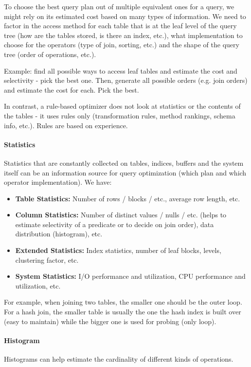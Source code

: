 To choose the best query plan out of multiple equivalent ones for a query, we might rely on its estimated cost based on many types of information. We need to factor in the access method for each table that is at the leaf level of the query tree (how are the tables stored, is there an index, etc.), what implementation to choose for the operators (type of join, sorting, etc.) and the shape of the query tree (order of operations, etc.).

Example: find all possible ways to access leaf tables and estimate the cost and selectivity - pick the best one. Then, generate all possible orders (e.g. join orders) and estimate the cost for each. Pick the best.

In contrast, a rule-based optimizer does not look at statistics or the contents of the tables - it uses rules only (transformation rules, method rankings, schema info, etc.). Rules are based on experience.

\paragraph{Statistics}
Statistics that are constantly collected on tables, indices, buffers and the system itself can be an information source for query optimization (which plan and which operator implementation). We have:

\begin{itemize}
    \item \textbf{Table Statistics:} Number of rows / blocks / etc., average row length, etc.
    \item \textbf{Column Statistics:} Number of distinct values / nulls / etc. (helps to estimate selectivity of a predicate or to decide on join order), data distribution (histogram), etc.
    \item \textbf{Extended Statistics:} Index statistics, number of leaf blocks, levels, clustering factor, etc.
    \item \textbf{System Statistics:} I/O performance and utilization, CPU performance and utilization, etc.
\end{itemize}

For example, when joining two tables, the smaller one should be the outer loop. For a hash join, the smaller table is usually the one the hash index is built over (easy to maintain) while the bigger one is used for probing (only loop).


\paragraph{Histogram}
Histograms can help estimate the cardinality of different kinds of operations.

